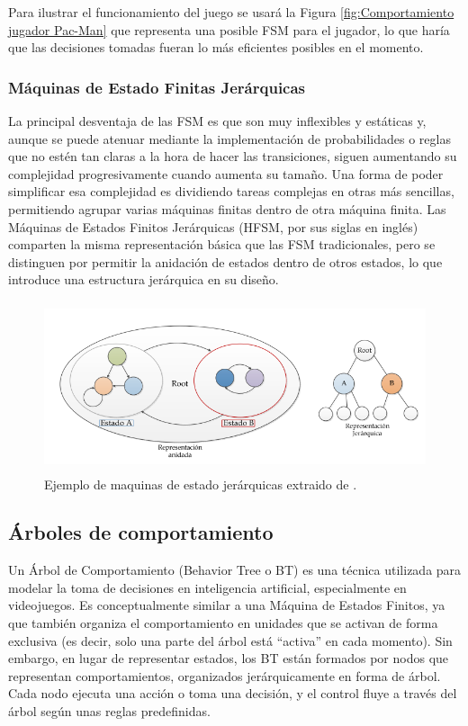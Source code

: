Para ilustrar el funcionamiento del juego se usará la Figura \ref{fig:Comportamiento jugador Pac-Man} que representa una posible FSM para el jugador, lo que haría que las decisiones tomadas fueran lo más eficientes posibles en el momento.\\


\subsubsection{Máquinas de Estado Finitas Jerárquicas}

La principal desventaja de las FSM es que son muy inflexibles y estáticas y, aunque se puede atenuar mediante la implementación de probabilidades o reglas que no estén tan claras a la hora de hacer las transiciones, siguen aumentando su complejidad progresivamente cuando aumenta su tamaño. Una forma de poder simplificar esa complejidad es dividiendo tareas complejas en otras más sencillas, permitiendo agrupar varias máquinas finitas dentro de otra máquina finita. Las Máquinas de Estados Finitos Jerárquicas (HFSM, por sus siglas en inglés) comparten la misma representación básica que las FSM tradicionales, pero se distinguen por permitir la anidación de estados dentro de otros estados, lo que introduce una estructura jerárquica en su diseño.
\begin{figure}[h!]
	\centering
	\includegraphics[height=5cm]{Imagenes/HFSM.png}
	\caption{Ejemplo de maquinas de estado jerárquicas extraido de \cite{JorgeHFSM}.}
	\label{fig:Maquinas de estado jerárquicas}
\end{figure}

\subsection{Árboles de comportamiento}

Un Árbol de Comportamiento (Behavior Tree o BT) es una técnica utilizada para modelar la toma de decisiones en inteligencia artificial, especialmente en videojuegos. Es conceptualmente similar a una Máquina de Estados Finitos, ya que también organiza el comportamiento en unidades que se activan de forma exclusiva (es decir, solo una parte del árbol está ``activa'' en cada momento). Sin embargo, en lugar de representar estados, los BT están formados por nodos que representan comportamientos, organizados jerárquicamente en forma de árbol. Cada nodo ejecuta una acción o toma una decisión, y el control fluye a través del árbol según unas reglas predefinidas. \\

